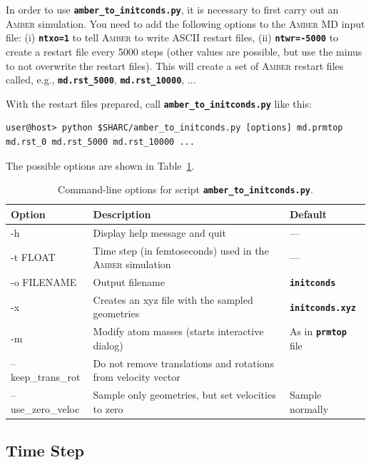 \documentclass[a4paper,10pt,DIV=15,openany,twoside=false]{scrbook}
\newcommand{\ttt}[1]{\textbf{\texttt{#1}}}
\begin{document}
In order to use \ttt{amber\_to\_initconds.py}, it is necessary to first carry out an \textsc{Amber} simulation.
You need to add the following options to the \textsc{Amber} MD input file: (i) \ttt{ntxo=1} to tell \textsc{Amber} to write ASCII restart files, (ii) \ttt{ntwr=-5000} to create a restart file every 5000 steps (other values are possible, but use the minus to not overwrite the restart files).
This will create a set of \textsc{Amber} restart files called, e.g., \ttt{md.rst\_5000}, \ttt{md.rst\_10000}, ...

With the restart files prepared, call \ttt{amber\_to\_initconds.py} like this:
\begin{verbatim}
user@host> python $SHARC/amber_to_initconds.py [options] md.prmtop md.rst_0 md.rst_5000 md.rst_10000 ...
\end{verbatim}
The possible options are shown in Table~\ref{tab:amber_opts}.

\begin{table}
  \centering
  \caption{Command-line options for script \ttt{amber\_to\_initconds.py}.}
  \label{tab:amber_opts}
  \begin{tabular}{>{\ttfamily}lp{9cm}l}
    \toprule
    \rmfamily Option        &Description      &Default\\
    \midrule
    -h                  &Display help message and quit              &---                            \\
    -t  FLOAT           &Time step (in femtoseconds) used in the \textsc{Amber} simulation      &---\\
    -o  FILENAME        &Output filename                            &\ttt{initconds}                \\
    -x                  &Creates an xyz file with the sampled geometries &\ttt{initconds.xyz}       \\
    -m                  &Modify atom masses (starts interactive dialog)  &As in \ttt{prmtop} file   \\
    --keep\_trans\_rot  &Do not remove translations and rotations from velocity vector &\\
    --use\_zero\_veloc  &Sample only geometries, but set velocities to zero     &Sample normally\\
    \bottomrule
  \end{tabular}
\end{table}

\subsection{Time Step}
\end{document}
